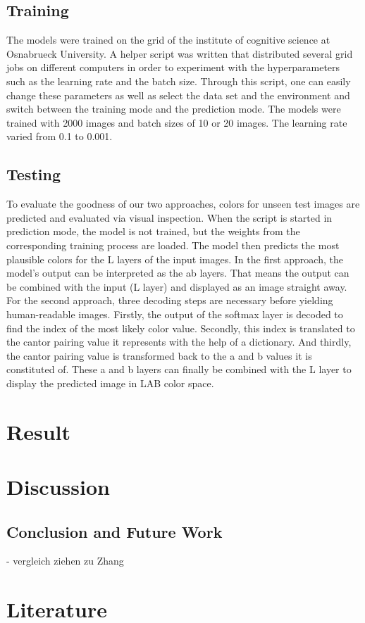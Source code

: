 \documentclass[12pt,letterpaper]{article}
\begin{document}
\subsection{Training}
The models were trained on the grid of the institute of cognitive science at Osnabrueck University. A helper script was written that distributed several grid jobs on different computers in order to experiment with the hyperparameters such as the learning rate and the batch size. Through this script, one can easily change these parameters as well as select the data set and the environment and switch between the training mode and the prediction mode. The models were trained with 2000 images and batch sizes of 10 or 20 images. The learning rate varied from 0.1 to 0.001.

\subsection{Testing}
To evaluate the goodness of our two approaches, colors for unseen test images are predicted and evaluated via visual inspection. When the script is started in prediction mode, the model is not trained, but the weights from the corresponding training process are loaded. The model then predicts the most plausible colors for the L layers of the input images.
In the first approach, the model's output can be interpreted as the ab layers. That means the output can be combined with the input (L layer) and displayed as an image straight away.
For the second approach, three decoding steps are necessary before yielding human-readable images. Firstly, the output of the softmax layer is decoded to find the index of the most likely color value. Secondly, this index is translated to the cantor pairing value it represents with the help of a dictionary. And thirdly, the cantor pairing value is transformed back to the a and b values it is constituted of. These a and b layers can finally be combined with the L layer to display the predicted image in LAB color space.

\section{Result}
\section{Discussion}

\subsection{Conclusion and Future Work}
- vergleich ziehen zu Zhang\\
\newpage
\thispagestyle{empty}
\section{Literature}
\label{Lit}

\renewcommand{\bibsection}{}


	
\end{document}
